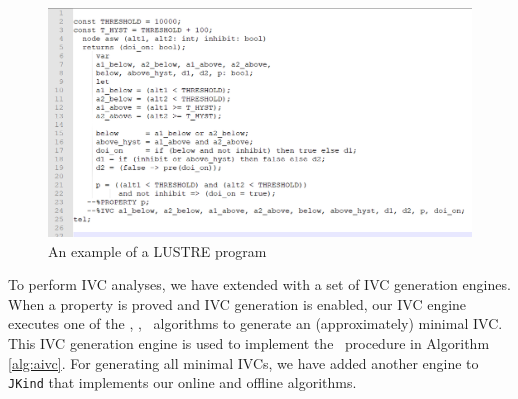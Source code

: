 \begin{figure}
 \centering
  \includegraphics[width=\textwidth]{figs/exjk.png}
  \caption{An example of a LUSTRE program}
  \vspace{0.1in}
  \label{fig:exjk}
\end{figure}

To perform IVC analyses, we have extended \jkind with a set of IVC generation engines. When a property is
proved and IVC generation is enabled, our IVC engine
executes one of the {\ucalg, \bfalg, \ucbfalg}~algorithms \cite{Ghass16} to generate an (approximately) minimal IVC. This IVC generation engine is used to implement the \getivc\ procedure in  Algorithm \ref{alg:aivc}. For generating all minimal IVCs, we have added another engine to \texttt{JKind} that implements our online and offline algorithms.

